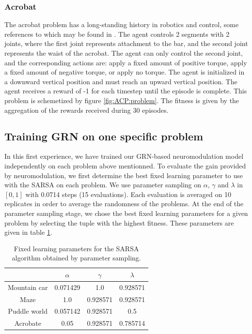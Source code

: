 \subsubsection{Acrobat}

The acrobat problem has a long-standing history in robotics and control, some references to which may be found in \cite{sutton1998introduction}. The agent controls 2 segments with 2 joints, where the first joint represents attachment to the bar, and the second joint represents the waist of the acrobat. The agent can only control the second joint, and the corresponding actions are: apply a fixed amount of positive torque, apply a fixed amount of negative torque, or apply no torque. The agent is initialized in a downward vertical position and must reach an upward vertical position. The agent receives a reward of -1 for each timestep until the episode is complete. This problem is schemetized by figure \ref{fig:ACP:problem}. The fitness is given by the aggregation of the rewards received during 30 episodes.

\subsection{Training GRN on one specific problem}
In this first experience, we have trained our GRN-based neuromodulation model independently on each problem above mentionned. To evaluate the gain provided by neuromodulation, we first determine the best fixed learning parameter to use with the SARSA on each problem. We use parameter sampling on $\alpha$, $\gamma$ and $\lambda$ in $[0, 1]$ with 0.0714 steps (15 evaluations). Each evaluation is averaged on 10 replicates in order to average the randomness of the problems. At the end of the parameter sampling stage, we chose the best fixed learning parameters for a given problem by selecting the tuple with the highest fitness. These parameters are given in table \ref{tab:SARSAFixedParams}.

\begin{table}[h]
\center
\begin{tabular}{|c|ccc|}
\cline{2-4}
\multicolumn{1}{c|}{ }	& $\alpha$	& $\gamma$	& $\lambda$	\\\hline
Mountain car			& 0.071429	& 1.0		& 0.928571 	\\%
Maze				& 1.0		& 0.928571	& 0.928571	\\%
Puddle world			&  0.057142	& 0.928571	& 0.5		\\%
Acrobate				& 0.05		& 0.928571	& 0.785714	\\\hline
\end{tabular}
\caption{Fixed learning parameters for the SARSA algorithm obtained by parameter sampling.}\label{tab:SARSAFixedParams}
\end{table}

